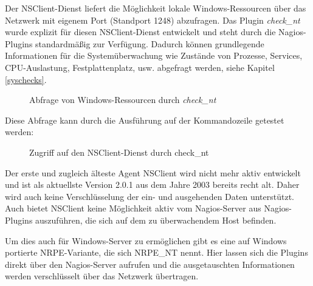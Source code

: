 

Der NSClient-Dienst liefert die Möglichkeit lokale Windows-Ressourcen über das Netzwerk mit eigenem Port (Standport 1248) abzufragen.
Das Plugin \textit{check\_nt} wurde explizit für diesen NSClient-Dienst entwickelt und steht durch die Nagios-Plugins standardmäßig zur Verfügung.
Dadurch können grundlegende Informationen für die Systemüberwachung wie Zustände von Prozesse, Services, CPU-Auslastung, Festplattenplatz, usw. abgefragt werden, siehe Kapitel \ref{syschecks}.

\begin{figure}[ht]
	\centering
		\caption{Abfrage von Windows-Ressourcen durch \textit{check\_nt}}
		\label{fig:cknt}
\end{figure}

Diese Abfrage kann durch die Ausführung auf der Kommandozeile getestet werden:

\begin{figure}[ht]
	\centering
		\caption{Zugriff auf den NSClient-Dienst durch check\_nt}
		\label{fig:cknt}
\end{figure}

Der erste und zugleich älteste Agent NSClient wird nicht mehr aktiv entwickelt und ist als aktuellste Version 2.0.1 aus dem Jahre 2003 bereits recht alt.
Daher wird auch keine Verschlüsselung der ein- und ausgehenden Daten unterstützt.
Auch bietet NSClient keine Möglichkeit aktiv vom Nagios-Server aus Nagios-Plugins auszuführen, die sich auf dem zu überwachendem Host befinden.

Um dies auch für Windows-Server zu ermöglichen gibt es eine auf Windows portierte \gls{NRPE}-Variante, die sich NRPE\_NT nennt.
Hier lassen sich die Plugins direkt über den Nagios-Server aufrufen und die ausgetauschten Informationen werden verschlüsselt über das Netzwerk übertragen.

